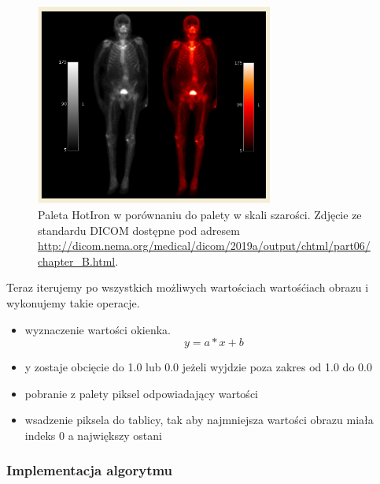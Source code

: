 \begin{figure}[!htbp]
    \centering
    \includegraphics[width=0.7\textwidth]{img/monochrome-001.png}
    \caption{Paleta HotIron w porównaniu do palety w skali szarości. Zdjęcie ze standardu DICOM dostępne pod adresem \url{http://dicom.nema.org/medical/dicom/2019a/output/chtml/part06/chapter_B.html}.}
    \label{fig:monochrome1}
\end{figure}

Teraz iterujemy po wszystkich możliwych wartościach wartośćiach obrazu i wykonujemy takie operacje.
\begin{itemize}
    \item wyznaczenie wartości okienka.
          \[y = a * x + b\]
    \item y zostaje obcięcie do 1.0 lub 0.0 jeżeli wyjdzie poza zakres od 1.0 do 0.0
    \item pobranie z palety piksel odpowiadający wartości
    \item wsadzenie piksela do tablicy, tak aby najmniejsza wartości obrazu miała indeks 0 a największy ostani
\end{itemize}


\subsubsection{Implementacja algorytmu}

